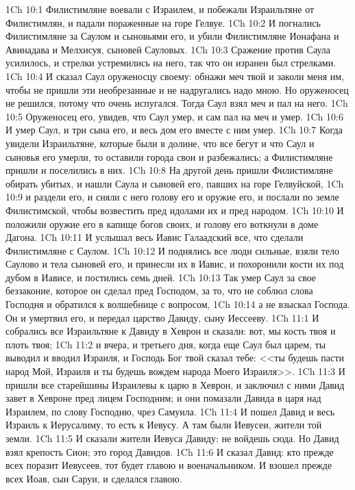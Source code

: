 \vs 1Ch 10:1 Филистимляне воевали с Израилем, и побежали Израильтяне от Филистимлян, и падали пораженные на горе Гелвуе.
\vs 1Ch 10:2 И погнались Филистимляне за Саулом и сыновьями его, и убили Филистимляне Ионафана и Авинадава и Мелхисуя, сыновей Сауловых.
\vs 1Ch 10:3 Сражение против Саула усилилось, и стрелки устремились на него, так что он изранен был стрелками.
\vs 1Ch 10:4 И сказал Саул оруженосцу своему: обнажи меч твой и заколи меня им, чтобы не пришли эти необрезанные и не надругались надо мною. Но оруженосец не решился, потому что очень испугался. Тогда Саул взял меч и пал на него.
\vs 1Ch 10:5 Оруженосец его, увидев, что Саул умер, и сам пал на меч и умер.
\vs 1Ch 10:6 И умер Саул, и три сына его, и весь дом его вместе с ним умер.
\vs 1Ch 10:7 Когда увидели Израильтяне, которые были в долине, что все бегут и что Саул и сыновья его умерли, то оставили города свои и разбежались; а Филистимляне пришли и поселились в них.
\vs 1Ch 10:8 На другой день пришли Филистимляне обирать убитых, и нашли Саула и сыновей его, павших на горе Гелвуйской,
\vs 1Ch 10:9 и раздели его, и сняли с него голову его и оружие его, и послали по земле Филистимской, чтобы возвестить  пред идолами их и пред народом.
\vs 1Ch 10:10 И положили оружие его в капище богов своих, и голову его воткнули в доме Дагона.
\vs 1Ch 10:11 И услышал весь Иавис Галаадский все, что сделали Филистимляне с Саулом.
\vs 1Ch 10:12 И поднялись все люди сильные, взяли тело Саулово и тела сыновей его, и принесли их в Иавис, и похоронили кости их под дубом в Иависе, и постились семь дней.
\rsbpar\vs 1Ch 10:13 Так умер Саул за свое беззаконие, которое он сделал пред Господом, за то, что не соблюл слова Господня и обратился к волшебнице с вопросом,
\vs 1Ch 10:14 а не взыскал Господа.  Он и умертвил его, и передал царство Давиду, сыну Иессееву.
\vs 1Ch 11:1 И собрались все Израильтяне к Давиду в Хеврон и сказали: вот, мы кость твоя и плоть твоя;
\vs 1Ch 11:2 и вчера, и третьего дня, когда еще Саул был царем, ты выводил и вводил Израиля, и Господь Бог твой сказал тебе: <<ты будешь пасти народ Мой, Израиля и ты будешь вождем народа Моего Израиля>>.
\vs 1Ch 11:3 И пришли все старейшины Израилевы к царю в Хеврон, и заключил с ними Давид завет в Хевроне пред лицем Господним; и они помазали Давида в царя над Израилем, по слову Господню, чрез Самуила.
\rsbpar\vs 1Ch 11:4 И пошел Давид и весь Израиль к Иерусалиму, то есть к Иевусу. А там были Иевусеи, жители той земли.
\vs 1Ch 11:5 И сказали жители Иевуса Давиду: не войдешь сюда. Но Давид взял крепость Сион; это город Давидов.
\vs 1Ch 11:6 И сказал Давид: кто прежде всех поразит Иевусеев, тот будет главою и военачальником. И взошел прежде всех Иоав, сын Саруи, и сделался главою.
